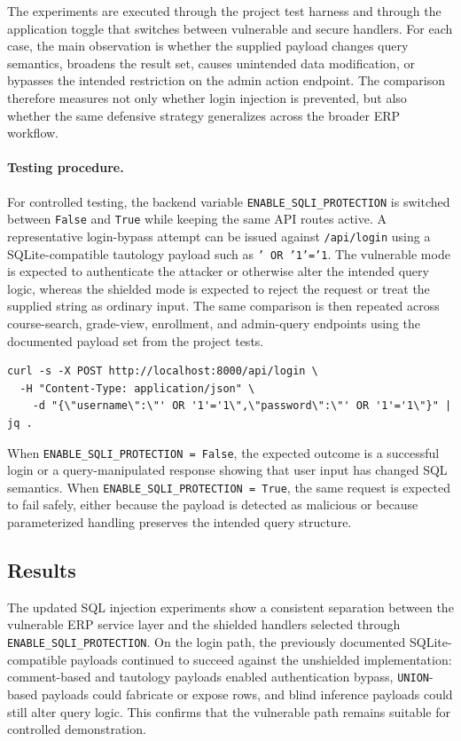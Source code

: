\documentclass[11pt,a4paper]{article}
\begin{document}
The experiments are executed through the project test harness and through the application toggle that switches between vulnerable and secure handlers. For each case, the main observation is whether the supplied payload changes query semantics, broadens the result set, causes unintended data modification, or bypasses the intended restriction on the admin action endpoint. The comparison therefore measures not only whether login injection is prevented, but also whether the same defensive strategy generalizes across the broader ERP workflow.

\paragraph{Testing procedure.}
For controlled testing, the backend variable \texttt{ENABLE\_SQLI\_PROTECTION} is switched between \texttt{False} and \texttt{True} while keeping the same API routes active. A representative login-bypass attempt can be issued against \texttt{/api/login} using a SQLite-compatible tautology payload such as \texttt{' OR '1'='1}. The vulnerable mode is expected to authenticate the attacker or otherwise alter the intended query logic, whereas the shielded mode is expected to reject the request or treat the supplied string as ordinary input. The same comparison is then repeated across course-search, grade-view, enrollment, and admin-query endpoints using the documented payload set from the project tests.

\begin{verbatim}
curl -s -X POST http://localhost:8000/api/login \
  -H "Content-Type: application/json" \
    -d "{\"username\":\"' OR '1'='1\",\"password\":\"' OR '1'='1\"}" | jq .
\end{verbatim}

When \texttt{ENABLE\_SQLI\_PROTECTION = False}, the expected outcome is a successful login or a query-manipulated response showing that user input has changed SQL semantics. When \texttt{ENABLE\_SQLI\_PROTECTION = True}, the same request is expected to fail safely, either because the payload is detected as malicious or because parameterized handling preserves the intended query structure.

\subsection{Results}

The updated SQL injection experiments show a consistent separation between the vulnerable ERP service layer and the shielded handlers selected through \texttt{ENABLE\_SQLI\_PROTECTION}. On the login path, the previously documented SQLite-compatible payloads continued to succeed against the unshielded implementation: comment-based and tautology payloads enabled authentication bypass, \texttt{UNION}-based payloads could fabricate or expose rows, and blind inference payloads could still alter query logic. This confirms that the vulnerable path remains suitable for controlled demonstration.
\end{document}
